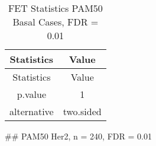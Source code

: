 \documentclass[]{article}
\begin{document}
\begin{longtable}[]{@{}cc@{}}
\caption{FET Statistics PAM50 Basal Cases, FDR = 0.01}\tabularnewline
\toprule
\begin{minipage}[b]{0.18\columnwidth}\centering\strut
Statistics\strut
\end{minipage} & \begin{minipage}[b]{0.14\columnwidth}\centering\strut
Value\strut
\end{minipage}\tabularnewline
\midrule
\endfirsthead
\toprule
\begin{minipage}[b]{0.18\columnwidth}\centering\strut
Statistics\strut
\end{minipage} & \begin{minipage}[b]{0.14\columnwidth}\centering\strut
Value\strut
\end{minipage}\tabularnewline
\midrule
\endhead
\begin{minipage}[t]{0.18\columnwidth}\centering\strut
p.value\strut
\end{minipage} & \begin{minipage}[t]{0.14\columnwidth}\centering\strut
1\strut
\end{minipage}\tabularnewline
\begin{minipage}[t]{0.18\columnwidth}\centering\strut
alternative\strut
\end{minipage} & \begin{minipage}[t]{0.14\columnwidth}\centering\strut
two.sided\strut
\end{minipage}\tabularnewline
\bottomrule
\end{longtable}

\pagebreak
\#\# PAM50 Her2, n = 240, FDR = 0.01
\end{document}

